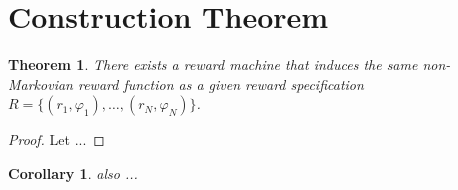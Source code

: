 \documentclass[12pt, a4paper]{article}
\theoremstyle{plain}
\newtheorem*{theorem}{Theorem}
\newtheorem*{corollary}{Corollary}
\renewcommand{\phi}{\varphi}
\begin{document}
\section*{Construction Theorem}

\begin{theorem}
	There exists a reward machine that induces the same non-Markovian reward function as a given reward specification $R = \{(r_1, \phi_1), \dots, (r_N, \phi_N)\}$.
\end{theorem}

\begin{proof}
	Let ...
\end{proof}

\begin{corollary}
	also ...
\end{corollary}

\end{document}
